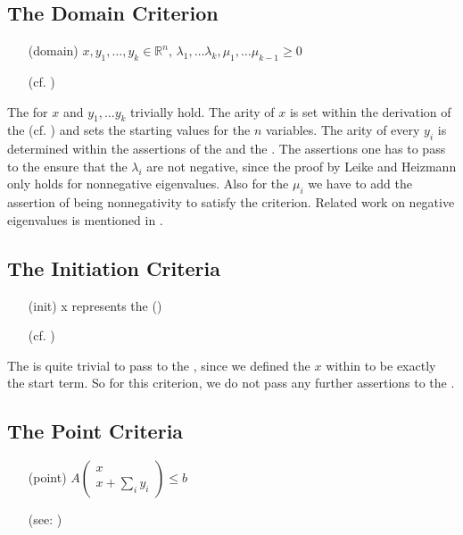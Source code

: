 \subsection{The Domain Criterion}
\begin{itemize}
	\setlength{\itemindent}{1in}
	\item[(domain)] $x, y_1, \dots, y_k \in \mathbb{R}^n$, $\lambda_1, \dots \lambda_k, \mu_1, \dots \mu_{k-1} \ge 0$
	\item[] (cf. )
\end{itemize}
The \domc for $x$ and $y_1, \dots y_k$ trivially hold.
The arity of $x$ is set within the derivation of the \stem (cf. ) and sets the starting values for the $n$ variables. The arity of every $y_i$ is determined within the assertions of the \pointc and the \rayc.\newline
The assertions one has to pass to the \solver ensure that the $\lambda_i$ are not negative, since the proof by Leike and Heizmann only holds for nonnegative eigenvalues. Also for the $\mu_i$ we have to add the assertion of being nonnegativity to satisfy the criterion. \newline
Related work on negative eigenvalues is mentioned in .
\subsection{The Initiation Criteria}
\begin{itemize}
	\setlength{\itemindent}{1in}
	\item[(init)] x represents the \startterm (\stem)
	\item[] (cf. )
\end{itemize}

The \initc is quite trivial to pass to the \solver, since we defined the \stem $x$ within  to be exactly the start term. So for this criterion, we do not pass any further assertions to the \solver.

\subsection{The Point Criteria}
\label{sec:point-criteria}
\begin{itemize}
	\setlength{\itemindent}{1in}
	\item[(point)] $A\begin{pmatrix} x \\ x + \sum_i y_i \end{pmatrix} \le b$
	\item[] (see: )
\end{itemize}

